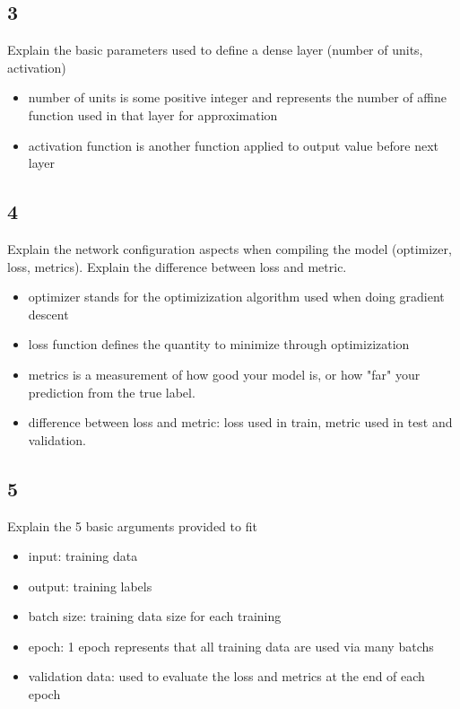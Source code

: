 \documentclass{article}
\begin{document}
\subsection*{3}
\begin{myleftlinebox}
    Explain the basic parameters used to define a dense layer (number of units, activation)
    \tcblower
    \begin{itemize}
        \item number of units is some positive integer and represents the number of affine function used in that layer for approximation
        \item activation function is another function applied to output value before next layer
    \end{itemize}
\end{myleftlinebox}

\subsection*{4}
\begin{myleftlinebox}
    Explain the network configuration aspects when compiling the model (optimizer, loss, metrics). Explain the difference between loss and metric.
    \tcblower
    \begin{itemize}
        \item optimizer stands for the optimizization algorithm used when doing gradient descent
        \item loss function defines the quantity to minimize through optimizization
        \item metrics is a measurement of how good your model is, or how "far" your prediction from the true label. 
        \item difference between loss and metric: loss used in train, metric used in test and validation.
    \end{itemize}
\end{myleftlinebox}

\subsection*{5}
\begin{myleftlinebox}
    Explain the 5 basic arguments provided to fit
    \tcblower
    \begin{itemize}
        \item input: training data
        \item output: training labels
        \item batch size: training data size for each training
        \item epoch: 1 epoch represents that all training data are used via many batchs
        \item validation data: used to evaluate the loss and  metrics at the end of each epoch
    \end{itemize}
\end{myleftlinebox}
\end{document}
